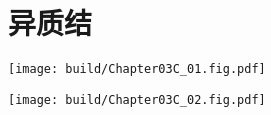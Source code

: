 \section{异质结}

\begin{Figure}[异质结的能带图]
    \begin{FigureSub}
        \texttt{[image: build/Chapter03C\_01.fig.pdf]}
    \end{FigureSub}
    \hspace{0.5cm}
    \begin{FigureSub}
        \texttt{[image: build/Chapter03C\_02.fig.pdf]}
    \end{FigureSub}
\end{Figure}